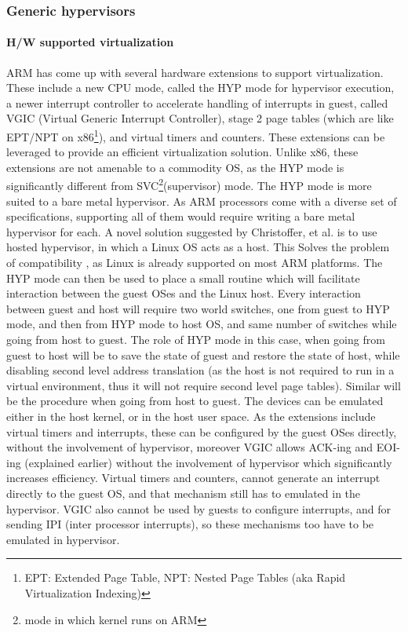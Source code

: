 \documentclass[seminar,twoside]{iitbreport}
\begin{document}
  \subsubsection{Generic hypervisors}
  
  \paragraph{H/W supported virtualization}

  ARM has come up with several hardware extensions to support virtualization. These include a new CPU mode, called the HYP mode for hypervisor execution,
  a newer interrupt controller to accelerate handling of interrupts in guest, called VGIC (Virtual Generic Interrupt Controller), stage 2 page tables (which are like EPT/NPT on x86\footnote{EPT: Extended Page Table, NPT: Nested Page Tables (aka Rapid Virtualization Indexing)}),
  and virtual timers and counters. 
  These extensions can be leveraged to provide an efficient virtualization solution. Unlike x86, these extensions are not amenable to a commodity OS, as the HYP mode is significantly
  different from SVC\footnote{mode in which kernel runs on ARM}(supervisor)  mode.
  The HYP mode is more suited to a bare metal hypervisor. As ARM processors come with a diverse set of specifications, supporting all of them would require
  writing a bare metal hypervisor for each. A novel solution suggested by Christoffer, et al. \cite{Dall:2014:KDI:2541940.2541946} is to use hosted hypervisor, in which
  a Linux OS acts as a host. This Solves the problem of compatibility , as Linux is already supported on most ARM platforms.
  The HYP mode can then be used to place a small routine which will facilitate interaction between the guest OSes and the Linux host.
  Every interaction between guest and host will require two world switches, one from guest to HYP mode, and then from HYP mode to host OS, and same number of switches while going 
  from host to guest. The role of HYP mode in this case, when going from guest to host will be to save the state of guest and restore the state of host, while disabling second level address translation
  (as the host is not required to run in a virtual environment, thus it will not require second level page tables). Similar will be the procedure when going from host to guest.
  The devices can be emulated either in the host kernel, or in the host user space. As the extensions include virtual timers and interrupts, these can be configured by the
  guest OSes directly, without the involvement of hypervisor, moreover VGIC allows ACK-ing and EOI-ing (explained earlier) without the involvement of hypervisor which
  significantly increases efficiency. Virtual timers and counters, cannot generate an interrupt directly to the guest OS, and that mechanism still has to emulated in the
  hypervisor. VGIC also cannot be used by guests to configure interrupts, and for sending IPI (inter processor interrupts), so these mechanisms too have to be
  emulated in hypervisor.
  
\end{document}
